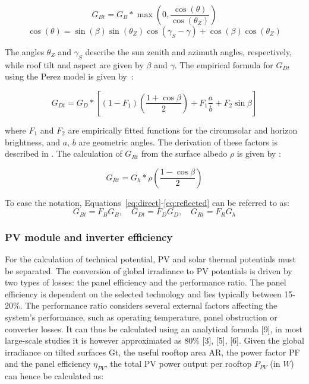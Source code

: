 \begin{equation}
\label{eq:direct}
    G_{Bt} = G_{B} * \max \left( 0, \frac{\cos(\theta)}{\cos(\theta_Z)} \right)
\end{equation}
\begin{equation}
\label{eq:dir_angle}
\cos(\theta) = \sin(\beta) \sin(\theta_Z) \cos(\gamma_S - \gamma) + \cos(\beta) \cos(\theta_Z) 
\end{equation}

The angles $\theta_Z$ and $\gamma_S$ describe the sun zenith and azimuth angles, respectively, while roof tilt and aspect are given by $\beta$ and $\gamma$.
%
The empirical formula for $G_{Dt}$ using the Perez model is given by~\cite{perez_modeling_1990}:

\begin{equation}
\label{eq:diffuse}
G_{Dt} = G_D * \left[ (1 - F_1) \left( \frac{1 + \cos \beta}{2} \right) 
       + F_1 \frac{ a }{ b }
       + F_2 \sin \beta \right]
\end{equation}

where $F_1$ and $F_2$ are empirically fitted functions for the circumsolar and horizon brightness, and $a$, $b$ are geometric angles. The derivation of these factors is described in \cite{loutzenhiser_empirical_2007}.
%
The calculation of $G_{Rt}$ from the surface albedo $\rho$ is given by \cite{duffie_solar_2013}:

\begin{equation}
\label{eq:reflected}
G_{Rt} = G_h * \rho \left( \frac{1-\cos \beta}{2} \right)
\end{equation}

To ease the notation, Equations~\ref{eq:direct}-\ref{eq:reflected} can be referred to as:
\begin{equation}
\label{eq:tilted_irrad_simplified}
G_{Bt} = F_B G_B, \quad G_{Dt} = F_D G_D, \quad G_{Rt} = F_R G_h
\end{equation}



\subsubsection{PV module and inverter efficiency}
\label{app:efficiency}

For the calculation of technical potential, PV and solar thermal potentials must be separated. The conversion of global irradiance to PV potentials is driven by two types of losses: the panel efficiency and the performance ratio. The panel efficiency is dependent on the selected technology and lies typically between 15-20\%. The performance ratio considers several external factors affecting the system’s performance, such as operating temperature, panel obstruction or converter losses. It can thus be calculated using an analytical formula [9], in most large-scale studies it is however approximated as 80\% [3], [5], [6]. Given the global irradiance on tilted surfaces Gt, the useful rooftop area AR, the power factor PF and the panel efficiency $\eta_{PV}$, the total PV power output per rooftop $P_{PV}$ (in $W$) can hence be calculated as:

